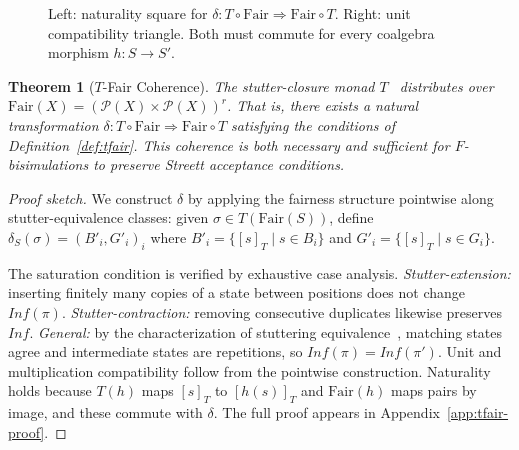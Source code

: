 \documentclass[11pt]{article}
\newtheorem{theorem}{Theorem}
\newcommand{\Pow}{\mathcal{P}}
\newcommand{\Fair}{\ensuremath{\mathrm{Fair}}}
\newcommand{\TFair}{$T$-Fair}
\begin{document}
\begin{figure}[t]
\centering
{}
\caption{Left: naturality square for $\delta : T \circ \Fair \Rightarrow
  \Fair \circ T$.
  Right: unit compatibility triangle.
  Both must commute for every coalgebra morphism $h : S \to S'$.}
\label{fig:coherence}
\end{figure}

\begin{theorem}[\TFair{} Coherence]
\label{thm:tfair}
The stutter-closure monad $T$~\cite{BeoharK17} distributes over
$\Fair(X) = (\Pow(X) \times \Pow(X))^r$.
That is, there exists a natural transformation
$\delta : T \circ \Fair \Rightarrow \Fair \circ T$ satisfying the
conditions of Definition~\ref{def:tfair}.
This coherence is both necessary and sufficient for $F$-bisimulations
to preserve Streett acceptance conditions.
\end{theorem}

\begin{proof}[Proof sketch]
We construct $\delta$ by applying the fairness structure pointwise along
stutter-equivalence classes: given $\sigma \in T(\Fair(S))$, define
$\delta_S(\sigma) = (B'_i, G'_i)_i$ where $B'_i = \{[s]_T \mid s \in B_i\}$
and $G'_i = \{[s]_T \mid s \in G_i\}$.

The saturation condition is verified by exhaustive case analysis.
\emph{Stutter-extension:} inserting finitely many copies of a state
between positions does not change $\mathit{Inf}(\pi)$.
\emph{Stutter-contraction:} removing consecutive duplicates likewise
preserves $\mathit{Inf}$.
\emph{General:} by the characterization of stuttering
equivalence~\cite{BeoharK17,Lamport94}, matching states agree and
intermediate states are repetitions, so
$\mathit{Inf}(\pi) = \mathit{Inf}(\pi')$.
Unit and multiplication compatibility follow from the pointwise
construction.
Naturality holds because $T(h)$ maps $[s]_T$ to $[h(s)]_T$ and $\Fair(h)$
maps pairs by image, and these commute with $\delta$.
The full proof appears in Appendix~\ref{app:tfair-proof}.
\end{proof}
\end{document}
